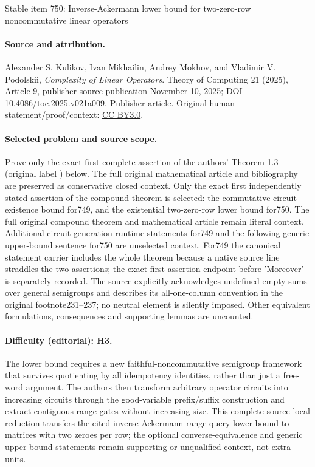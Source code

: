 \documentclass[11pt]{article}
\numberwithin{equation}{section}
\theoremstyle{definition}
\theoremstyle{plain}
\theoremstyle{plain}\newtheorem{observation}[theorem]{Observation}
\begin{document}
\begin{center}{\Large Stable item 750: Inverse-Ackermann lower bound for two-zero-row noncommutative linear operators}\end{center}
\paragraph{Source and attribution.}
Alexander S. Kulikov, Ivan Mikhailin, Andrey Mokhov, and Vladimir V. Podolskii, \emph{Complexity of Linear Operators}. Theory of Computing 21 (2025), Article 9, publisher source publication November 10, 2025; DOI 10.4086/toc.2025.v021a009. \href{https://theoryofcomputing.org/articles/v021a009/}{Publisher article}. Original human statement/proof/context: \href{https://creativecommons.org/licenses/by/3.0/}{CC BY3.0}.
\paragraph{Selected problem and source scope.}
Prove only the exact first complete assertion of the authors' Theorem 1.3 (original label ) below. The full original mathematical article and bibliography are preserved as conservative closed context. Only the exact first independently stated assertion of the compound theorem is selected: the commutative circuit-existence bound for749, and the existential two-zero-row lower bound for750. The full original compound theorem and mathematical article remain literal context. Additional circuit-generation runtime statements for749 and the following generic upper-bound sentence for750 are unselected context. For749 the canonical statement carrier includes the whole theorem because a native source line straddles the two assertions; the exact first-assertion endpoint before 'Moreover' is separately recorded. The source explicitly acknowledges undefined empty sums over general semigroups and describes its all-one-column convention in the original footnote231--237; no neutral element is silently imposed.  Other equivalent formulations, consequences and supporting lemmas are uncounted.
\paragraph{Difficulty (editorial): H3.}
The lower bound requires a new faithful-noncommutative semigroup framework that survives quotienting by all idempotency identities, rather than just a free-word argument. The authors then transform arbitrary operator circuits into increasing circuits through the good-variable prefix/suffix construction and extract contiguous range gates without increasing size. This complete source-local reduction transfers the cited inverse-Ackermann range-query lower bound to matrices with two zeroes per row; the optional converse-equivalence and generic upper-bound statements remain supporting or unqualified context, not extra units.
\end{document}

